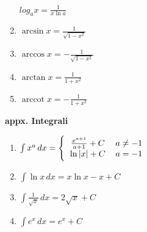 \documentclass{article}
\begin{document}
\begin{multicols}{3}
\begin{center}
\begin{small}
\begin{enumerate}
\begin{math}
                log_a x = \frac{1}{x \ln a}
            \end{math}
            \item \begin{math}
                \arcsin x = \frac{1}{\sqrt {1 - x^2}}
            \end{math}
            \item \begin{math}
                \arccos x = - \frac{1}{\sqrt{1 - x^2}}
            \end{math}
            \item \begin{math}
                \arctan x = \frac{1}{1 + x^2}
            \end{math}
            \item \begin{math}
                \operatorname{arccot}x = -\frac{1}{1 + x^2}
            \end{math}
        \end{enumerate}
    \end{small}
\end{center}
\textbf{appx. Integrali}
\begin{center}
    \begin{small}
        \begin{enumerate}
            \item \begin{math}
                \int x^a\,dx =
                \Bigg\{\begin{tabular}{ccc}
                    $\frac{x^{a+1}}{a+1} + C$  & $a \neq -1$ & \\
                    $ \ln{\left|x\right|} + C$ & $a = -1$ & \\
                  \end{tabular}
            \end{math}
            \item \begin{math}
                \int \ln {x}\,dx = x \ln {x} - x + C
            \end{math}
            \item \begin{math}
                \int \frac {1}{\sqrt{x}}\,dx=2\sqrt{x} + C 
            \end{math}
            \item \begin{math}
                \int e^x\,dx = e^x + C
            \end{math}

\end{enumerate}
\end{small}
\end{center}
\end{multicols}
\end{document}
